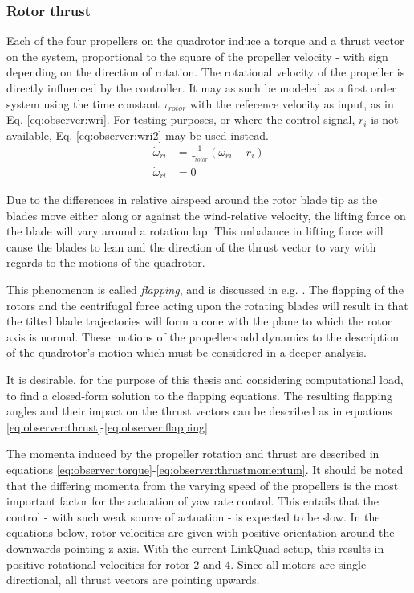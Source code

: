 \subsubsection{Rotor thrust}
\label{ssec:observer:thrust}
    Each of the four propellers on the quadrotor induce a torque
    and a thrust vector on the system, proportional to the square of the
    propeller velocity - with sign depending on the direction of rotation.
    The rotational velocity of the propeller is directly
    influenced by the controller. It may as such be modeled as a first order
    system using the time constant $\tau_{rotor}$ with
    the reference velocity as input, as in Eq. \eqref{eq:observer:wri}.
    For testing purposes, or where the control signal, $r_{i}$ is not available, Eq. \eqref{eq:observer:wri2} may be used instead.
    \begin{align}
        \dot{\omega}_{ri} &= \frac{1}{\tau_{rotor}} \left( \omega_{ri} - r_{i} \right) \label{eq:observer:wri} \\
        \dot{\omega}_{ri} &= 0 \label{eq:observer:wri2}
    \end{align}

    Due to the differences in relative airspeed around
    the rotor blade tip as the blades move either along or against
    the wind-relative velocity, the lifting force on the blade will vary
    around a rotation lap.
    This unbalance in lifting force will cause the blades to lean and the
    direction of the thrust vector to vary with regards to the motions of the quadrotor.

    This phenomenon is called \textit{flapping}, and is discussed
    in e.g. \citep{Pounds_modellingand}. The flapping of the rotors
    and the centrifugal force acting upon the rotating blades
    will result in that the tilted blade trajectories will
    form a cone with the plane to which the rotor axis is normal.
    These motions of the propellers add dynamics to the
    description of the quadrotor's motion which must be considered in a deeper analysis.

    It is desirable, for the purpose of this thesis and
    considering computational load, to find a closed-form
    solution to the flapping equations.
    The resulting flapping angles and their impact on
    the thrust vectors can be described as in equations
    \eqref{eq:observer:thrust}-\eqref{eq:observer:flapping}
    \citep{Pounds_modellingand,prouty1995helicopter,leishman2002principles}.

    The momenta induced by the propeller rotation and thrust
    are described in equations \eqref{eq:observer:torque}-\eqref{eq:observer:thrustmomentum}.
    It should be noted that the differing momenta from the varying speed of the
    propellers is the most important factor for the actuation of yaw rate control.
    This entails that the control - with such weak source of actuation - is expected to be slow.
    In the equations below, rotor velocities are given with positive orientation around the downwards
    pointing z-axis. With the current LinkQuad setup, this results in positive rotational velocities for
    rotor $2$ and $4$. Since all motors are single-directional, all thrust vectors are pointing upwards.

